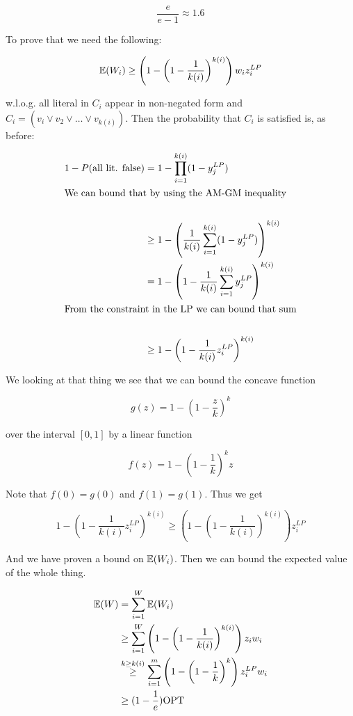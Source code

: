 \begin{Ex}
\[\frac {e}{e-1} \approx 1.6\]

To prove that we need the following:

\[\mathbb{E}(W_i) \geq \left(1-\left(1-\frac{1}{k(i)}\right)^{k(i)}\right)w_iz_i^{LP}\]

w.l.o.g. all literal in $C_i$ appear in non-negated form and $C_i=(v_i \vee v_2 \vee \ldots \vee v_{k(i)})$. Then the probability that $C_i$ is satisfied is, as before:

\begin{align*}
1-P(\text{all lit. false}) &= 1- \prod_{i=1}^{k(i)} (1-y_j^{LP})\\
\intertext{We can bound that by using the AM-GM inequality}\\
	&\geq 1-\left(\frac {1}{k(i)}\sum_{i=1}^{k(i)} (1-y_j^{LP})\right)^{k(i)}\\
	&= 1-\left(1-\frac{1}{k(i)}\sum_{i=1}^{k(i)}y_j^{LP}\right)^{k(i)}\\
\intertext{From the constraint in the LP we can bound that sum}\\
	&\geq 1-\left(1-\frac{1}{k(i)}z_i^{LP}\right)^{k(i)}\\
\end{align*}

We looking at that thing we see that we can bound the concave function 

\[g(z) = 1-\left(1-\frac zk\right)^k\]

over the interval $[0,1]$ by a linear function 

\[f(z) = 1-\left(1-\frac 1k\right)^k z\]

Note that $f(0)=g(0)$ and $f(1)=g(1)$. Thus we get

\[1-\left(1-\frac{1}{k(i)}z_i^{LP}\right)^{k(i)} \geq \left(1-\left(1-\frac{1}{k(i)}\right)^{k(i)}\right)z_i^{LP}\]

And we have proven a bound on $\mathbb{E}(W_i)$. Then we can bound the expected value of the whole thing.

\begin{align*}
\mathbb{E}(W) &= \sum_{i=1}^W \mathbb{E}(W_i)\\
	&\geq \sum_{i=1}^W \left(1-\left(1-\frac{1}{k(i)}\right)^{k(i)}\right) z_i w_i\\
	&\stackrel{k\geq k(i)}{\geq} \sum_{i=1}^m \left(1-\left(1-\frac{1}{k}\right)^k\right) z_i^{LP}w_i\\
	&\geq (1-\frac 1e)\text{OPT}
\end{align*}
\end{Ex}